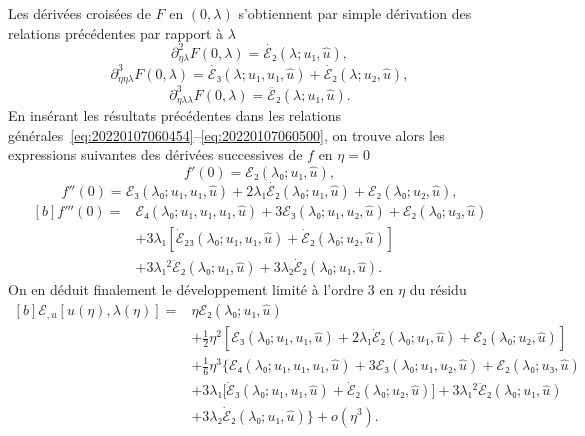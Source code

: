 \documentclass[12pt, final]{amsart}
\theoremstyle{definition}
\begin{document}
Les dérivées croisées de \(F\) en \((0, λ)\) s'obtiennent par simple dérivation
des relations précédentes par rapport à \(λ\)
\begin{equation}
 ∂_{ηλ}^2 F(0, λ) = \dot{ℰ₂}(λ; u₁, \hat{u}),
\end{equation}
\begin{equation}
 ∂_{ηηλ}^3 F(0, λ) = \dot{ℰ₃}(λ; u₁, u₁, \hat{u}) + \dot{ℰ₂}(λ; u₂, \hat{u}),
\end{equation}
\begin{equation}
 ∂_{ηλλ}^3 F(0, λ) = \ddot{ℰ₂}(λ; u₁, \hat{u}) .
\end{equation}
En insérant les résultats précédentes dans les relations
générales~\eqref{eq:20220107060454}--\eqref{eq:20220107060500}, on trouve alors
les expressions suivantes des dérivées successives de \(f\) en \(η = 0\)
\begin{equation}
 f'(0) =ℰ₂(λ₀; u₁, \hat{u}),
\end{equation}
\begin{equation}
 f''(0) = ℰ₃(λ₀; u₁, u₁, \hat{u}) + 2 λ₁ \dot{ℰ₂}(λ₀; u₁, \hat{u}) +ℰ₂(λ₀; u₂, \hat{u}),
\end{equation}
\begin{equation}
  \begin{aligned}[b]
    f'''(0) ={}
    & ℰ₄(λ₀; u₁, u₁, u₁, \hat{u}) + 3ℰ₃(λ₀; u₁, u₂, \hat{u}) + ℰ₂(λ₀ ; u₃, \hat{u})\\
    & + 3 λ₁ [\dot{ℰ}₂₃(λ₀; u₁, u₁, \hat{u}) + \dot{ℰ}₂(λ₀; u₂, \hat{u})]\\
    & + 3 λ₁^2 \ddot{ℰ}₂(λ₀; u₁, \hat{u}) + 3 λ₂ \dot{ℰ}₂(λ₀; u₁, \hat{u}) .
  \end{aligned}
\end{equation}
On en déduit finalement le développement limité à l'ordre 3 en \(η\) du résidu
\begin{equation}
  \label{eq:20220107080901}
  \begin{aligned}[b]
    ℰ_{, u}[u(η), λ(η)] ={} & η ℰ₂(λ₀; u₁, \hat{u}) \\
    & + \tfrac{1}{2} η^2 [ℰ₃(λ₀; u₁, u₁, \hat{u}) + 2 λ₁ \dot{ℰ}₂(λ₀; u₁, \hat{u}) + ℰ₂(λ₀; u₂, \hat{u})]\\
    & + \tfrac{1}{6} η^3 \bigl\{ ℰ₄(λ₀; u₁, u₁, u₁, \hat{u}) + 3ℰ₃(λ₀; u₁, u₂, \hat{u}) + ℰ₂(λ₀; u₃, \hat{u})\\
    & + 3 λ₁ \bigl[\dot{ℰ}₃(λ₀; u₁, u₁, \hat{u}) + \dot{ℰ}₂(λ₀; u₂, \hat{u})\bigr] + 3 λ₁^2 \ddot{ℰ}₂(λ₀; u₁, \hat{u}) \\
    &  + 3 λ₂ \dot{ℰ}₂(λ₀ ; u₁, \hat{u}) \bigr\} + o(η^3) .
  \end{aligned}
\end{equation}
\end{document}
